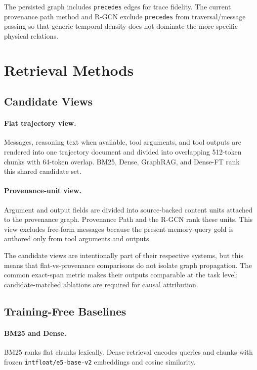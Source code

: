 \documentclass[sigconf,anonymous,review]{acmart}
\begin{document}
The persisted graph includes \texttt{precedes} edges for trace fidelity. The current provenance path method and R-GCN exclude \texttt{precedes} from traversal/message passing so that generic temporal density does not dominate the more specific physical relations.

\section{Retrieval Methods}
\label{sec:methods}

\subsection{Candidate Views}

\paragraph{Flat trajectory view.}
Messages, reasoning text when available, tool arguments, and tool outputs are rendered into one trajectory document and divided into overlapping 512-token chunks with 64-token overlap. BM25, Dense, GraphRAG, and Dense-FT rank this shared candidate set.

\paragraph{Provenance-unit view.}
Argument and output fields are divided into source-backed content units attached to the provenance graph. Provenance Path and the R-GCN rank these units. This view excludes free-form messages because the present memory-query gold is authored only from tool arguments and outputs.

The candidate views are intentionally part of their respective systems, but this means that flat-vs-provenance comparisons do not isolate graph propagation. The common exact-span metric makes their outputs comparable at the task level; candidate-matched ablations are required for causal attribution.

\subsection{Training-Free Baselines}

\paragraph{BM25 and Dense.}
BM25 ranks flat chunks lexically. Dense retrieval encodes queries and chunks with frozen \texttt{intfloat/e5-base-v2} embeddings and cosine similarity.
\end{document}
